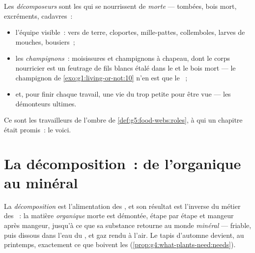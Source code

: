 \begin{definition}\label{def:g6:decomposers-and-soil:decomposers}
Les \emph{décomposeurs} sont les 
qui se nourrissent de \emph{ morte} --- 
tombées, bois mort, excréments, cadavres~:
\begin{itemize}
  \item l'équipe visible~: vers de terre, cloportes, mille-pattes,
        collemboles, larves de mouches, bousiers~;
  \item les \emph{champignons}~: moisissures et
        champignons à chapeau, dont le corps nourricier est un
        feutrage de fils blancs étalé dans le  et le bois mort
        --- le champignon de \cref{exo:g1:living-or-not:10} n'en
        est que le ~;
  \item et, pour finir chaque travail, une vie du  trop petite
        pour être vue --- les démonteurs ultimes.
\end{itemize}
Ce sont les travailleurs de l'ombre de
\cref{def:g5:food-webs:roles}, à qui un chapitre était promis~: le
voici.
\end{definition}

\section{La décomposition~: de l'organique au minéral}

\begin{proposition}\label{prop:g6:decomposers-and-soil:decomposition}
La \emph{décomposition} est l'alimentation des
, et son résultat est l'inverse du métier des
~: la matière \emph{organique} morte est démontée, étape
par étape et mangeur après mangeur, jusqu'à ce que sa substance
retourne au monde \emph{minéral} ---  friable, puis  dissous dans l'eau du , et gaz rendu à l'air. Le tapis
d'automne devient, au printemps, exactement ce que boivent les
 (\cref{prop:g4:what-plants-need:needs}).
\end{proposition}
\admitted

